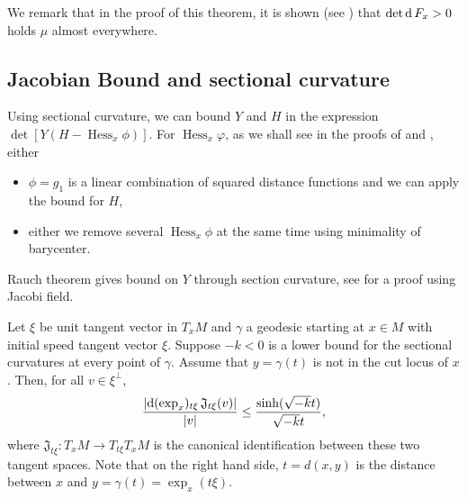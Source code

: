 We remark that in the proof of this theorem,
it is shown (see \cite[Claim 4.3 and Claim 4.4]{cordero2001riemannian}) that
$\det \operatorname{d} F_x > 0$ holds $\mu$ almost everywhere.

\subsection{Jacobian Bound and sectional curvature}

Using sectional curvature, we can bound $Y$ and $H$ in the expression $\det[ Y(H - \operatorname{Hess}_x \phi)]$.
For $\operatorname{Hess}_x \varphi$, as we shall see
in the proofs of  and ,
either
\begin{itemize}
	\item $\phi = g_1$ is a linear combination of squared distance functions and we can apply the bound for $H$,
	\item either we remove several $\operatorname{Hess}_x\phi$ at the same time using minimality of barycenter.
\end{itemize}

Rauch theorem gives bound on $Y$ through section curvature, see
\cite[Theorem IX.2.3]{chavel2006riemannian} for a proof using Jacobi field.
\begin{prop} 
	Let $\xi$ be unit tangent vector in $T_x M$
	and $\gamma$ a geodesic starting at $x \in M$ with initial speed tangent vector $\xi$.
	Suppose \( - k < 0 \) is a lower bound for
	the sectional curvatures at every point of \( \gamma \).
	Assume that \( y = \gamma (t)\) is not in the cut locus of $x$.
	Then, for all \( v \in \xi ^ { \perp } \),
	\begin{equation*}
		\frac { \left| \operatorname{d} ( \exp _ { x })  _ {t \xi } \,
			\mathfrak{J}_{t \xi}( v )\right| } { | v | }
		\leq \frac { \sinh (\sqrt{ -k } t )} {\sqrt{-k} t },
	\end{equation*}
	where $\mathfrak{J}_{t \xi}: T_x M \rightarrow T_{t \xi} T_x M$ is the canonical identification
	between these two tangent spaces.
	Note that on the right hand side, $t = d(x,y)$ is the distance between $x$ and $ y = \gamma(t) = \exp_x (t\xi)$.
\end{prop}

